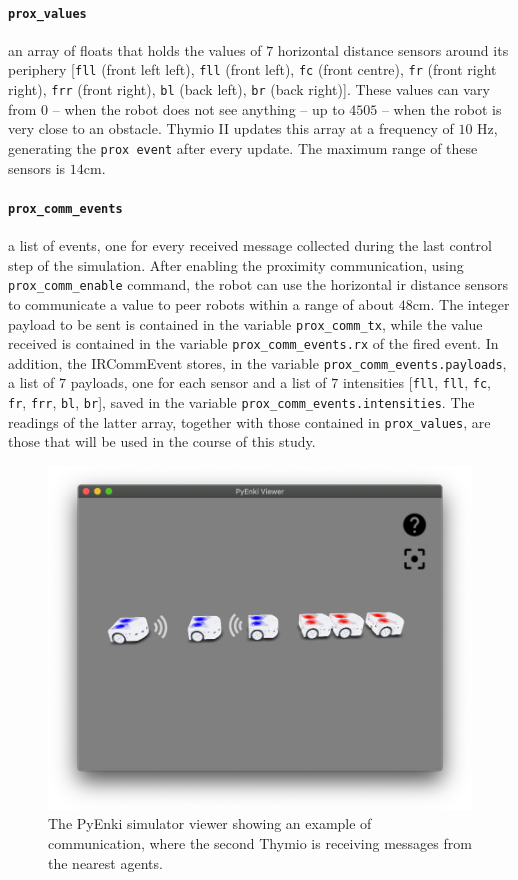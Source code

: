 \paragraph*{\texttt{prox\_values}}
 an array of floats that holds the values of $7$ horizontal distance sensors around 
 its periphery [\texttt{fll} (front left left), \texttt{fll} (front left), \texttt{fc} (front 
 centre), \texttt{fr} (front right right), \texttt{frr} (front right), \texttt{bl} (back left), 
 \texttt{br} (back right)]. 
These values can vary from $0$ – when the robot does not see anything – up to 
$4505$ – when the robot is very close to an obstacle. 
Thymio II updates this array at a frequency of $10$ \gls{Hz}, generating the 
\texttt{prox event} after every update. 
The maximum range of these sensors is $14$\gls{cm}.

\paragraph*{\texttt{prox\_comm\_events}}

a list of events, one for every received message collected during the last control 
step of the simulation. 
After enabling the proximity communication, using \texttt{prox\_comm\_enable} 
command, the robot can use the horizontal \gls{ir} distance sensors to 
communicate a value to peer robots within a range of about $48$\gls{cm}. 
The integer payload to be sent is contained in the variable 
\texttt{prox\_comm\_tx}, while the value received is contained in the variable 
\texttt{prox\_comm\_events.rx} of the fired event.
In addition, the IRCommEvent stores, in the variable 
\texttt{prox\_comm\_events.payloads}, a list of $7$ payloads, one for each sensor 
and a list of  $7$ intensities  [\texttt{fll}, \texttt{fll}, \texttt{fc}, \texttt{fr}, 
\texttt{frr}, \texttt{bl}, \texttt{br}], saved in the variable 
\texttt{prox\_comm\_events.intensities}.
The readings of the latter array, together with those contained in 
\texttt{prox\_values}, are those that will be used in the course of this study.

\begin{figure}[!htb]
	\centering
	\includegraphics[width=.6\textwidth]{contents/images/thymio-comm}
	\caption[Example of communication with the PyEnki simulator]{The PyEnki 
	simulator viewer showing an example of communication, 
	where the second Thymio is receiving messages from the nearest agents.}
	\label{fig:thymio comm}
\end{figure}

